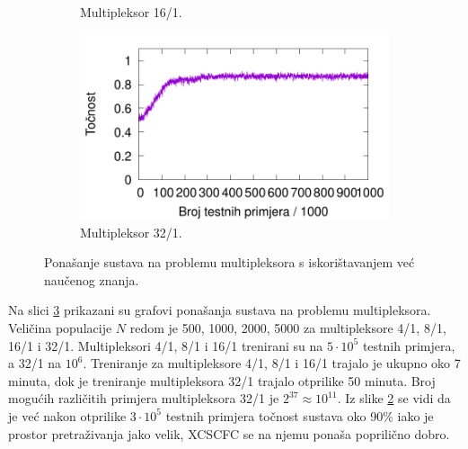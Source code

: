\documentclass[times, utf8, zavrsni]{fer}
\begin{document}
\begin{figure}[!h]
\begin{subfigure}{0.496\textwidth}
        \caption{Multipleksor 16/1.}
        \label{fig:20muxre}
    \end{subfigure}
    \begin{subfigure}{0.496\textwidth}
        \centering
        \includegraphics[width=\textwidth]{img/multiplexer/37muxre.pdf}
        \caption{Multipleksor 32/1.}
        \label{fig:37muxre}
    \end{subfigure}
    \caption{Ponašanje sustava na problemu multipleksora s iskorištavanjem već naučenog znanja.}
    \label{fig:muxre}
\end{figure}
Na slici \ref{fig:muxre} prikazani su grafovi ponašanja sustava na problemu multipleksora.
Veličina populacije $N$ redom je 500, 1000, 2000, 5000 za multipleksore 4/1, 8/1, 16/1 i 32/1.
Multipleksori 4/1, 8/1 i 16/1 trenirani su na $5 \cdot 10^{5}$ testnih primjera, a 32/1 na $10^{6}$.
Treniranje za multipleksore 4/1, 8/1 i 16/1 trajalo je ukupno oko 7 minuta, dok je treniranje multipleksora 32/1  trajalo otprilike 50 minuta.
Broj mogućih različitih primjera multipleksora 32/1 je $2^{37} \approx 10^{11}$.
Iz slike \ref{fig:37muxre} se vidi da je već nakon otprilike $3 \cdot 10^{5}$ testnih primjera točnost sustava oko 90\% iako je prostor pretraživanja jako velik, XCSCFC se na njemu ponaša poprilično dobro.
\end{document}
